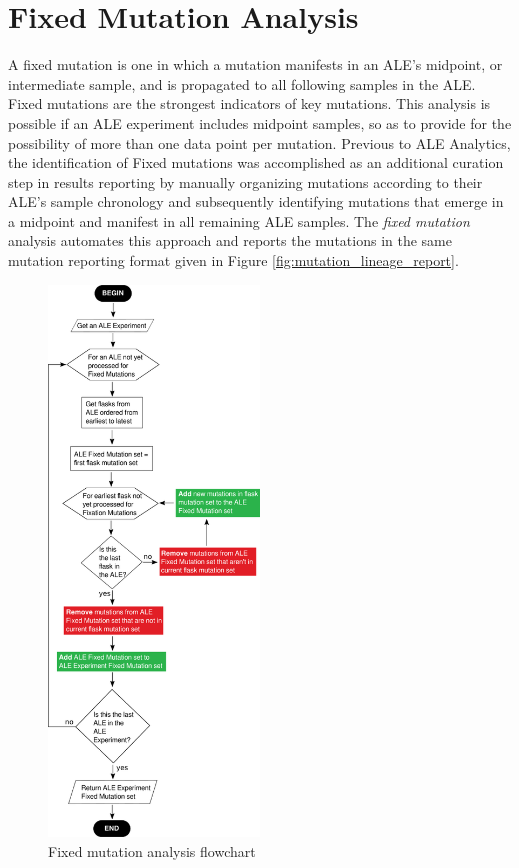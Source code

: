 \documentclass[12pt,final,masters,chapterheads]{ucsd}  %
\begin{document}
\section{Fixed Mutation Analysis}

A fixed mutation is one in which a mutation manifests in an ALE's midpoint, or intermediate sample, and is propagated to all following samples in the ALE. Fixed mutations are the strongest indicators of key mutations. This analysis is possible if an ALE experiment includes midpoint samples, so as to provide for the possibility of more than one data point per mutation. Previous to ALE Analytics, the identification of Fixed mutations was accomplished as an additional curation step in results reporting by manually organizing mutations according to their ALE's sample chronology and subsequently identifying mutations that emerge in a midpoint and manifest in all remaining ALE samples. The \textit{fixed mutation} analysis automates this approach and reports the mutations in the same mutation reporting format given in Figure \ref{fig:mutation_lineage_report}.
\begin{figure}[H]
  \centering
  \includegraphics[width=0.50\textwidth]{fixed_mutation_flowchart.png}
  \caption{Fixed mutation analysis flowchart}
\end{figure}
\end{document}
